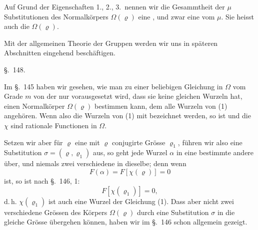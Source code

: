
Auf Grund der Eigenschaften 1., 2., 3.\ nennen wir die Gesammtheit der $\mu$ Substitutionen des Normalkörpers $\Omega(\varrho)$ eine , und zwar eine  vom  $\mu$. Sie heisst auch die  $\Omega(\varrho)$.

Mit der allgemeinen Theorie der Gruppen werden wir uns in späteren Abschnitten eingehend beschäftigen.

\begin{center}
\S.\ 148.
\end{center}

\begin{center}
\end{center}

Im \S.\ 145 haben wir gesehen, wie man zu einer beliebigen Gleichung in $\Omega$ vom Grade $m$
von der nur vorausgesetzt wird, dass sie keine gleichen Wurzeln hat, einen Normalkörper $\Omega(\varrho)$ bestimmen kann, dem alle Wurzeln von (1) angehören. Wenn also die Wurzeln von (1) mit
bezeichnet werden, so ist
und die $\chi$ sind rationale Functionen in $\Omega$.

Setzen wir aber für $\varrho$ eine mit $\varrho$ conjugirte Grösse $\varrho_1$, führen wir also eine Substitution $\sigma = (\varrho, \varrho_1)$ aus, so geht jede Wurzel $\alpha$ in eine bestimmte andere über, und niemals zwei verschiedene in dieselbe; denn wenn
\[
F(\alpha) = F[\chi(\varrho)] = 0
\]
ist, so ist nach \S.\ 146, 1:
\[
F[\chi(\varrho_1)] = 0,
\]
d.\,h. $\chi(\varrho_1)$ ist auch eine Wurzel der Gleichung (1). Dass aber nicht zwei verschiedene Grössen des Körpers $\Omega(\varrho)$ durch eine Substitution $\sigma$ in die gleiche Grösse übergehen können, haben wir im \S.\ 146 schon allgemein gezeigt.

